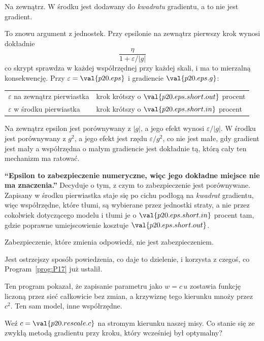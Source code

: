 \begin{fr}
\begin{ansblock}
Na zewnątrz. W środku jest dodawany do \emph{kwadratu} gradientu, a to nie jest
gradient.
\end{ansblock}

To znowu argument z jednostek. Przy epsilonie na zewnątrz pierwszy krok
wynosi dokładnie
\[ \frac{\eta}{1 + \varepsilon/\lvert g\rvert} \]
co skrypt sprawdza w każdej współrzędnej przy każdej skali, i ma to mierzalną
konsekwencję. Przy $\varepsilon = \val{p20.eps}$ i gradiencie
$\val{p20.eps.g}$:

\begin{center}
\begin{tabular}{ll}
\toprule
$\varepsilon$ na zewnątrz pierwiastka & krok krótszy o $\val{p20.eps.short.out}$ procent \\
$\varepsilon$ w środku pierwiastka & krok krótszy o $\val{p20.eps.short.in}$ procent \\
\bottomrule
\end{tabular}
\end{center}

Na zewnątrz epsilon jest porównywany z $\lvert g \rvert$, a jego efekt wynosi
$\varepsilon/\lvert g\rvert$. W środku jest porównywany z $g^{2}$, a jego efekt
jest rzędu $\varepsilon/g^{2}$, co nie jest małe, gdy gradient jest mały
\dash{} a współrzędna o małym gradiencie jest dokładnie tą, którą cały ten
mechanizm ma ratować.
\end{fr}

\begin{fr}
\begin{trapbox}
\textbf{\enquote{Epsilon to zabezpieczenie numeryczne, więc jego dokładne
miejsce nie ma znaczenia.}} Decyduje o tym, z czym to zabezpieczenie jest
porównywane. Zapisany w środku pierwiastka staje się po cichu podłogą na
\emph{kwadrat} gradientu, więc współrzędne, które tłumi, są wybierane przez
jednostki straty, a nie przez cokolwiek dotyczącego modelu \dash{} i tłumi je o
$\val{p20.eps.short.in}$ procent tam, gdzie poprawne umiejscowienie kosztuje
$\val{p20.eps.short.out}$.

Zabezpieczenie, które zmienia odpowiedź, nie jest zabezpieczeniem.
\end{trapbox}
\end{fr}

\begin{fr}
Jest ostrzejszy sposób powiedzenia, co daje to dzielenie, i korzysta z czegoś,
co Program~\ref{prog:P17} już ustalił.

Ten program pokazał, że zapisanie parametru jako $w = c\,u$ zostawia funkcję
liczoną przez sieć całkowicie bez zmian, a krzywiznę tego kierunku mnoży przez
$c^{2}$. Ten sam model, inne współrzędne.

Weź $c = \val{p20.rescale.c}$ na stromym kierunku naszej misy. Co stanie się ze
zwykłą metodą gradientu przy kroku, który wcześniej był optymalny?
\nextframe
\end{fr}

